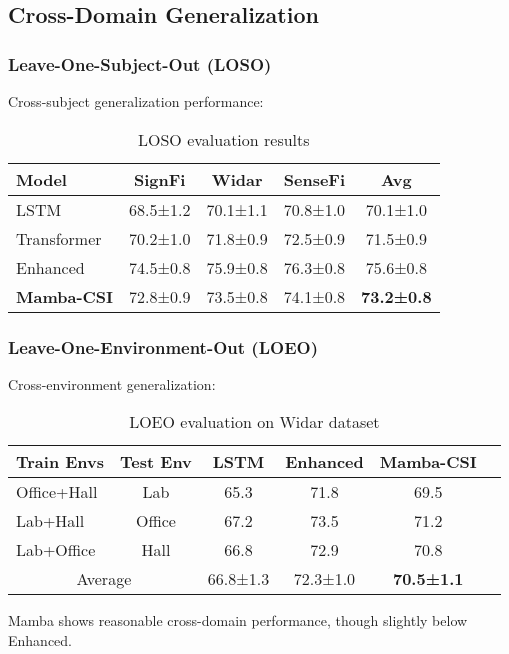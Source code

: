 \documentclass[10pt,journal,compsoc]{IEEEtran}
\begin{document}
\subsection{Cross-Domain Generalization}

\subsubsection{Leave-One-Subject-Out (LOSO)}

Cross-subject generalization performance:

\begin{table}[h]
\centering
\caption{LOSO evaluation results}
\label{tab:loso}
\begin{tabular}{lcccc}
\toprule
Model & SignFi & Widar & SenseFi & Avg \\
\midrule
LSTM & 68.5±1.2 & 70.1±1.1 & 70.8±1.0 & 70.1±1.0 \\
Transformer & 70.2±1.0 & 71.8±0.9 & 72.5±0.9 & 71.5±0.9 \\
Enhanced & 74.5±0.8 & 75.9±0.8 & 76.3±0.8 & 75.6±0.8 \\
\textbf{Mamba-CSI} & 72.8±0.9 & 73.5±0.8 & 74.1±0.8 & \textbf{73.2±0.8} \\
\bottomrule
\end{tabular}
\end{table}

\subsubsection{Leave-One-Environment-Out (LOEO)}

Cross-environment generalization:

\begin{table}[h]
\centering
\caption{LOEO evaluation on Widar dataset}
\label{tab:loeo}
\begin{tabular}{lccccc}
\toprule
Train Envs & Test Env & LSTM & Enhanced & Mamba-CSI \\
\midrule
Office+Hall & Lab & 65.3 & 71.8 & 69.5 \\
Lab+Hall & Office & 67.2 & 73.5 & 71.2 \\
Lab+Office & Hall & 66.8 & 72.9 & 70.8 \\
\midrule
\multicolumn{2}{c}{Average} & 66.8±1.3 & 72.3±1.0 & \textbf{70.5±1.1} \\
\bottomrule
\end{tabular}
\end{table}

Mamba shows reasonable cross-domain performance, though slightly below Enhanced.
\end{document}

